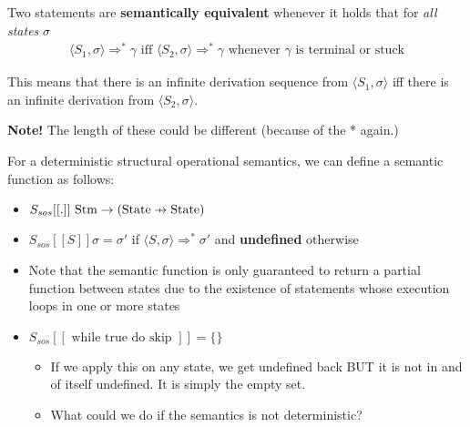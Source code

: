 \documentclass[11pt,a4paper,titlepage,dvipsnames,cmyk]{scrartcl}
\newcommand\pfun{\mathrel{\ooalign{\hfil$\mapstochar\mkern5mu$\hfil\cr$\to$\cr}}}
\begin{document}
Two statements are \textbf{semantically equivalent} whenever it holds that
for \textit{all states} $\sigma$
\begin{align*}
    \langle S_1, \sigma \rangle \Rightarrow^* \gamma \text{ iff } \langle
    S_2, \sigma \rangle
    \Rightarrow^* \gamma \text{ whenever } \gamma \text{ is terminal or
stuck} 
\end{align*}

This means that there is an infinite derivation sequence from $\langle S_1,
\sigma \rangle$ iff there is an infinite derivation from $\langle S_2,
\sigma \rangle$.

\textbf{Note!} The length of these could be different (because of the *
again.)

For a deterministic structural operational semantics, we can define a
semantic function as follows:
\begin{itemize}
    \item $S_{sos} [[.]] \text{ Stm} \rightarrow (\text{State} \pfun
        \text{State})$
    \item $S_{sos} [[S]] \sigma = \sigma'$ if $\langle S, \sigma \rangle
        \Rightarrow^* \sigma'$ and \textbf{undefined} otherwise
    \item Note that the semantic function is only guaranteed to return a
        partial function between states due to the existence of statements
        whose execution loops in one or more states
    \item $S_{sos} [[\text{ while true do skip }]] = \{\}$
    \begin{itemize}
        \item If we apply this on any state, we get undefined back BUT it
            is not in and of itself undefined. It is simply the empty set.
        \item What could we do if the semantics is not deterministic?
\end{itemize}
\end{itemize}
\end{document}
